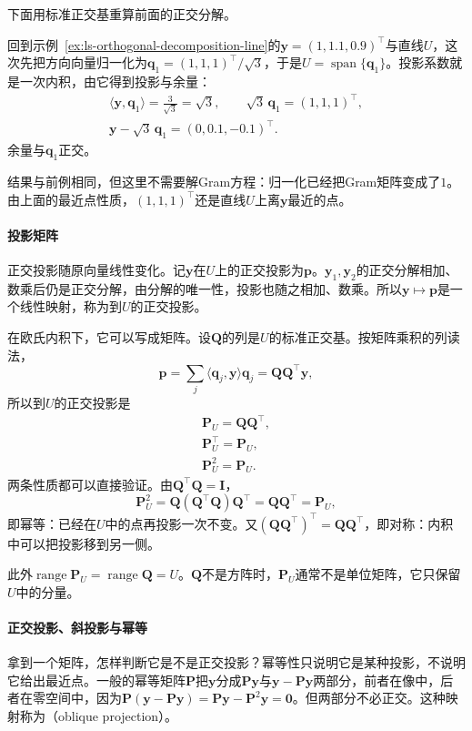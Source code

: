 下面用标准正交基重算前面的正交分解。
\begin{example}[用标准正交基重算正交分解]
\label{ex:ls-orthonormal-projection-line}
回到示例~\ref{ex:ls-orthogonal-decomposition-line}的$\bm y=(1,1.1,0.9)^\top$与直线$U$，这次先把方向向量归一化为$\bm q_1=(1,1,1)^\top/\sqrt3$，于是$U=\operatorname{span}\{\bm q_1\}$。投影系数就是一次内积，由它得到投影与余量：
\[
 \begin{gathered}
 \langle\bm y,\bm q_1\rangle=\frac3{\sqrt3}=\sqrt3,\qquad
 \sqrt3\,\bm q_1=(1,1,1)^\top,\\
 \bm y-\sqrt3\,\bm q_1=(0,0.1,-0.1)^\top .
 \end{gathered}
\]
余量与$\bm q_1$正交。

结果与前例相同，但这里不需要解Gram方程：归一化已经把Gram矩阵变成了$1$。由上面的最近点性质，$(1,1,1)^\top$还是直线$U$上离$\bm y$最近的点。
\end{example}

\paragraph{投影矩阵}
\label{sec:ls-projection-matrices}
正交投影随原向量线性变化。记$\bm y$在$U$上的正交投影为$\bm p$。$\bm y_1,\bm y_2$的正交分解相加、数乘后仍是正交分解，由分解的唯一性，投影也随之相加、数乘。所以$\bm y\mapsto\bm p$是一个线性映射，称为到$U$的正交投影。

在欧氏内积下，它可以写成矩阵。设$\bm Q$的列是$U$的标准正交基。按矩阵乘积的列读法，
\[
 \bm p=\sum_j\langle\bm q_j,\bm y\rangle\bm q_j=\bm Q\bm Q^\top\bm y,
\]
所以到$U$的正交投影是
\begin{equation}
\begin{gathered}
\bm P_U=\bm Q\bm Q^\top,\\
\bm P_U^\top=\bm P_U,\\
\bm P_U^2=\bm P_U.
\end{gathered}
\label{eq:linear-algebra-orthogonal-projector}
\end{equation}
两条性质都可以直接验证。由$\bm Q^\top\bm Q=\bm I$，
\[
 \bm P_U^2=\bm Q(\bm Q^\top\bm Q)\bm Q^\top=\bm Q\bm Q^\top=\bm P_U,
\]
即幂等：已经在$U$中的点再投影一次不变。又$(\bm Q\bm Q^\top)^\top=\bm Q\bm Q^\top$，即对称：内积中可以把投影移到另一侧。

此外$\operatorname{range}\bm P_U=\operatorname{range}\bm Q=U$。$\bm Q$不是方阵时，$\bm P_U$通常不是单位矩阵，它只保留$U$中的分量。

\paragraph{正交投影、斜投影与幂等}
拿到一个矩阵，怎样判断它是不是正交投影？幂等性只说明它是某种投影，不说明它给出最近点。一般的幂等矩阵$\bm P$把$\bm y$分成$\bm P\bm y$与$\bm y-\bm P\bm y$两部分，前者在像中，后者在零空间中，因为$\bm P(\bm y-\bm P\bm y)=\bm P\bm y-\bm P^2\bm y=\bm0$。但两部分不必正交。这种映射称为（oblique projection）。

